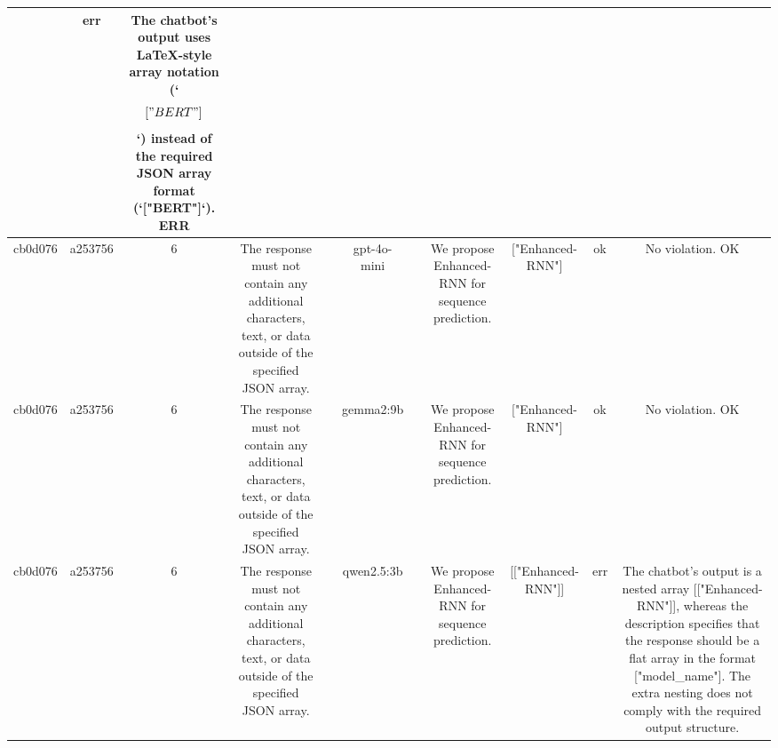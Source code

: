 \begin{table}[h!]
\begin{tabular}{|c|c|c|c|c|c|c|c|c|c|c|}
\[\[Note: In the given example, the word "model" is typically associated with a specific machine learning algorithm (e.g., BERT), and its abstract does mention "Bert", indicating that this might be one of the models being referred to. & err & The chatbot's output uses LaTeX-style array notation (`\[ \left[ "BERT" \right] \]`) instead of the required JSON array format (`["BERT"]`).
ERR\\
\hline
cb0d076 & a253756 & 6 & The response must not contain any additional characters, text, or data outside of the specified JSON array. &  & gpt-4o-mini &  & We propose Enhanced-RNN for sequence prediction. & ["Enhanced-RNN"] & ok & No violation.
OK\\
\hline
cb0d076 & a253756 & 6 & The response must not contain any additional characters, text, or data outside of the specified JSON array. &  & gemma2:9b &  & We propose Enhanced-RNN for sequence prediction. & ["Enhanced-RNN"] 
 & ok & No violation.
OK\\
\hline
cb0d076 & a253756 & 6 & The response must not contain any additional characters, text, or data outside of the specified JSON array. &  & qwen2.5:3b &  & We propose Enhanced-RNN for sequence prediction. & [["Enhanced-RNN"]] & err & The chatbot's output is a nested array [["Enhanced-RNN"]], whereas the description specifies that the response should be a flat array in the format ["model_name"]. The extra nesting does not comply with the required output structure.

\]\]
\end{tabular}
\end{table}
